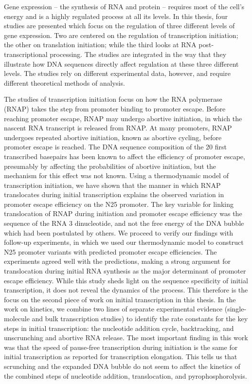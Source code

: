 Gene expression -- the synthesis of RNA and protein -- requires most of the
cell's energy and is a highly regulated process at all its levels. In this
thesis, four studies are presented which focus on the regulation of three
different levels of gene expression. Two are centered on the regulation of
transcription initiation; the other on translation initiation; while the
third looks at RNA post-transcriptional processing. The studies are integrated
in the way that they illustrate how DNA sequences directly affect regulation at
these three different levels. The studies rely on different experimental data,
however, and require different theoretical methods of analysis.

The studies of transcription initiation focus on how the RNA polymerase (RNAP)
takes the step from promoter binding to promoter escape. Before reaching
promoter escape, RNAP may undergo abortive initiation, in which the nascent RNA
transcript is released from RNAP. At many promoters, RNAP undergoes repeated
abortive initiation, known as abortive cycling, before promoter escape is
reached. The DNA sequence composition of the 20 first transcribed basepairs has
been known to affect the efficiency of promoter escape, presumably by affecting the
probabilities of abortive initiation, but the mechanism for this effect was not
known. Using a thermodynamic model of transcription initiation, we have shown
that the manner in which RNAP translocates during initial
transcription explains the observed variation in promoter escape efficiency on
the N25 promoter. The key variable for linking translocation of RNAP during
initiation and promoter escape efficiency was the sequence of the RNA 3\ppp
dinucleotide, and not the free energy of the DNA bubble which had been
postulated by others. We proceed to verify our findings with follow-up
experiments, in which we used our thermodynamic model to construct N25 promoter
variants with predicted promoter escape efficiencies. The experiments agreed
well with the predictions, making a strong argument for translocation during
initial RNA synthesis as the major determinant of promoter escape efficiency.
While this study sheds light on  the sequence specificity of initial
transcription, it does not reveal the dynamics of the process. This therefore
is the focus on the second piece of work on initial transcription in this
thesis. In the work on kinetics, we combine two lines of separate experimental
evidence (single-molecule and bulk transcription studies) to identify the rate
constants for the key steps in initial transcription: the nucleotide addition
cycle, backtracking, and unscrunching and abortive RNA release. The most
important finding in this work was that the speed of pause-free transcription
during initiation is the same for initial transcription as reported for
transcription elongation. This tells us that scrunching and the expanded DNA
bubble do not seem to affect the kinetics of the combined steps of nucleotide
addition, translocation, and pyrophosphorolysis.

